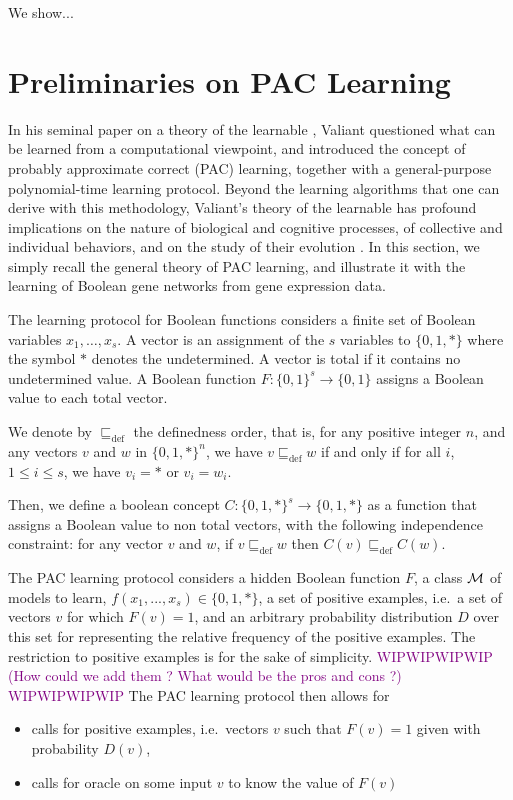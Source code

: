 \documentclass{llncs}
\newcommand{\wip}[1]{\textcolor{Purple}{WIPWIPWIPWIP #1 WIPWIPWIPWIP}}
\newcommand{\defleq}{\sqsubseteq_{\text{def}}}
\begin{document}
We show...

\section{Preliminaries on PAC Learning}\label{pac}

In his seminal paper on a theory of the learnable \cite{Valiant84cacm},
Valiant questioned what can be learned from a computational viewpoint,
and introduced the concept of probably approximate correct (PAC) learning,
together with a general-purpose polynomial-time learning protocol.
Beyond the learning algorithms that one can derive with this methodology,
Valiant's theory of the learnable has profound implications
on the nature of biological and cognitive processes,
of collective and individual behaviors,
and on the study of their evolution \cite{Valiant13book}.
In this section, we simply recall the general theory of PAC learning,
and illustrate it with the learning of Boolean gene networks from gene expression data.

The learning protocol for Boolean functions considers
a finite set of Boolean variables $x_1,\ldots,x_s$.
A vector is an assignment of the $s$ variables to $\{0,1,*\}$
where the symbol $*$ denotes the undetermined.
A vector is total if it contains no undetermined value.
A Boolean function $F:\{0,1\}^s \rightarrow\{0,1\}$
assigns a Boolean value to each total vector.

We denote by $\defleq$ the definedness order, that is, for any positive integer $n$, and any vectors $v$ and $w$ in $\{0,1,*\}^n$, we have $v \defleq w$ if and only if for all $i$, $1 \leq i \leq s$, we have $v_i = *$ or $v_i = w_i$.

Then, we define a boolean concept $C:\{0,1,*\}^s \rightarrow\{0,1,*\}$ as a function that
assigns a Boolean value to non total vectors,
with the following independence constraint:
for any vector $v$ and $w$, if $v \defleq w$ then $C(v) \defleq C(w)$.

The PAC learning protocol considers a hidden Boolean function $F$,
a class $\cal M$ of models to learn, $f(x_1,...,x_s) \in \{0,1,*\}$,
a set of positive examples, i.e.~a set of vectors $v$ for which $F(v)=1$,
and an arbitrary probability distribution $D$ over this set
for representing the relative frequency of the positive examples.
The restriction to positive examples is for the sake of simplicity.
\wip{(How could we add them ? What would be the pros and cons ?)}
The PAC learning protocol then allows for
\begin{itemize}
  \item
calls for positive examples, i.e.~vectors $v$ such that $F(v)=1$ given with probability $D(v)$,
  \item
calls for oracle on some input $v$ to know the value of $F(v)$
\end{itemize}
\end{document}
